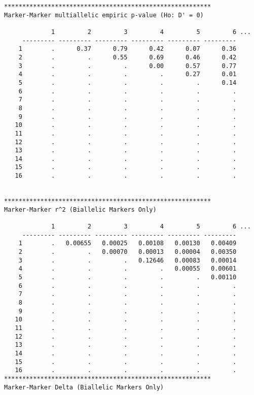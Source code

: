 \begin{verbatim}
*********************************************************
Marker-Marker multiallelic empiric p-value (Ho: D' = 0)

             1         2         3         4         5         6 ...
     --------- --------- --------- --------- --------- --------- 
    1        .      0.37      0.79      0.42      0.07      0.36 
    2        .         .      0.55      0.69      0.46      0.42 
    3        .         .         .      0.00      0.57      0.77 
    4        .         .         .         .      0.27      0.01 
    5        .         .         .         .         .      0.14 
    6        .         .         .         .         .         . 
    7        .         .         .         .         .         . 
    8        .         .         .         .         .         . 
    9        .         .         .         .         .         . 
   10        .         .         .         .         .         . 
   11        .         .         .         .         .         . 
   12        .         .         .         .         .         . 
   13        .         .         .         .         .         . 
   14        .         .         .         .         .         . 
   15        .         .         .         .         .         . 
   16        .         .         .         .         .         . 


*********************************************************
Marker-Marker r^2 (Biallelic Markers Only)

             1         2         3         4         5         6 ...
     --------- --------- --------- --------- --------- --------- 
    1        .   0.00655   0.00025   0.00108   0.00130   0.00409 
    2        .         .   0.00070   0.00013   0.00004   0.00350 
    3        .         .         .   0.12646   0.00083   0.00014 
    4        .         .         .         .   0.00055   0.00601 
    5        .         .         .         .         .   0.00110 
    6        .         .         .         .         .         . 
    7        .         .         .         .         .         . 
    8        .         .         .         .         .         . 
    9        .         .         .         .         .         . 
   10        .         .         .         .         .         . 
   11        .         .         .         .         .         . 
   12        .         .         .         .         .         . 
   13        .         .         .         .         .         . 
   14        .         .         .         .         .         . 
   15        .         .         .         .         .         . 
   16        .         .         .         .         .         . 
*********************************************************
Marker-Marker Delta (Biallelic Markers Only)


\end{verbatim}
